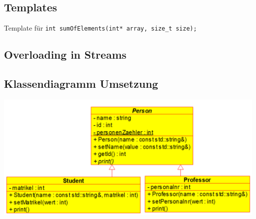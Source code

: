 \subsection{Templates}\label{Templates}
    Template für \verb|int sumOfElements(int* array, size_t size);|
    

\subsection{Overloading in Streams}
    

    \nextcol

\subsection{Klassendiagramm Umsetzung}
    \begin{center}
        \includegraphics[width=\columnwidth]{pictures/Klassendiagramm-Umsetzung.png}
    \end{center}

    

    \nextcol